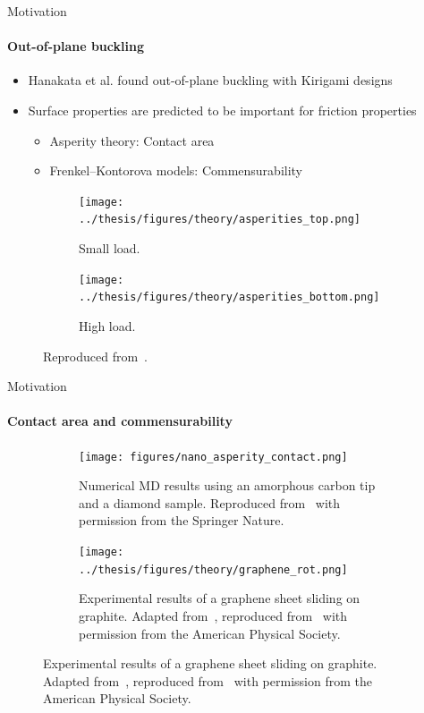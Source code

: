 \documentclass[
	10pt, %
]{beamer}
\begin{document}
\begin{frame}{Motivation}
	\framesubtitle{Out-of-plane buckling}
	\vspace{0.5cm}
	
	\begin{itemize}
		\item Hanakata et al. \cite{Hanakata_2018,Hanakata_2020} found out-of-plane buckling with Kirigami designs
		\item Surface properties are predicted to be important for friction properties
		\begin{itemize}
			\item Asperity theory: Contact area
			\item Frenkel–Kontorova models: Commensurability
		\end{itemize}
	\end{itemize}

	\begin{figure}[H]
		\centering
		\begin{subfigure}[b]{0.49\textwidth}
			\centering
			\texttt{[image: ../thesis/figures/theory/asperities\_top.png]}
			\caption{Small load.}
			\label{fig:asp_left}
		\end{subfigure}
		\hfill
		\begin{subfigure}[b]{0.49\textwidth}
			\centering
			\texttt{[image: ../thesis/figures/theory/asperities\_bottom.png]}
			\caption{High load.}
			\label{fig:asp_right}
		\end{subfigure}
		\caption{Reproduced from~\cite{wiki:asperities}.}
	\end{figure}
\end{frame}
%
%
\begin{frame}{Motivation}
\framesubtitle{Contact area and commensurability}
\begin{figure}[H]
	\centering
	\begin{subfigure}[b]{0.46\textwidth}
		\centering
		\texttt{[image: figures/nano\_asperity\_contact.png]}
		\caption{Numerical MD results using an amorphous carbon tip and a diamond sample. Reproduced from~\cite{mo_friction_2009} with permission from the Springer Nature.}
	\end{subfigure}
	\hfill
	\begin{subfigure}[b]{0.49\textwidth}
		\centering
		\texttt{[image: ../thesis/figures/theory/graphene\_rot.png]}
		\caption{Experimental results of a graphene sheet sliding on graphite. Adapted from~\cite{DIENWIEBEL2005197}, reproduced from~\cite{Vanossi_2013} with permission from the American Physical Society.}
	\end{subfigure}
\end{figure}
\end{frame}
%
%
\end{document}

